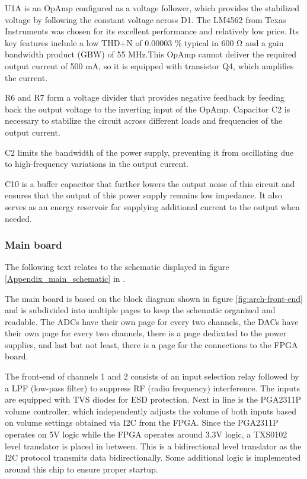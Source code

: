 U1A is an OpAmp configured as a voltage follower, which provides the stabilized voltage by following the constant voltage across D1. The LM4562 from Texas Instruments was chosen for its excellent performance and relatively low price. Its key features include a low THD+N of 0.00003 \% typical in 600 Ω and a gain bandwidth product (GBW) of 55 MHz.This OpAmp cannot deliver the required output current of 500 mA, so it is equipped with transistor Q4, which amplifies the current.

R6 and R7 form a voltage divider that provides negative feedback by feeding back the output voltage to the inverting input of the OpAmp. Capacitor C2 is necessary to stabilize the circuit across different loads and frequencies of the output current.

C2 limits the bandwidth of the power supply, preventing it from oscillating due to high-frequency variations in the output current.

C10 is a buffer capacitor that further lowers the output noise of this circuit and ensures that the output of this power supply remains low impedance. It also serves as an energy reservoir for supplying additional current to the output when needed.

\subsubsection{Main board}
The following text relates to the schematic displayed in figure \ref{Appendix_main_schematic} in .

The main board is based on the block diagram shown in figure \ref{fig:arch-front-end} and is subdivided into multiple pages to keep the schematic organized and readable. The ADCs have their own page for every two channels, the DACs have their own page for every two channels, there is a page dedicated to the power supplies, and last but not least, there is a page for the connections to the FPGA board.

The front-end of channels 1 and 2 consists of an input selection relay followed by a LPF (low-pass filter) to suppress RF (radio frequency) interference. The inputs are equipped with TVS diodes for ESD protection. Next in line is the PGA2311P volume controller, which independently adjusts the volume of both inputs based on volume settings obtained via I2C from the FPGA. Since the PGA2311P operates on 5V logic while the FPGA operates around 3.3V logic, a TXS0102 level translator is placed in between. This is a bidirectional level translator as the I2C protocol transmits data bidirectionally. Some additional logic is implemented around this chip to ensure proper startup.

